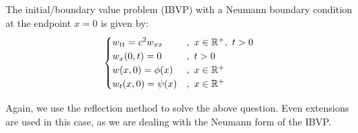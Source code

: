 \medskip 

\begin{defn} 
    The initial/boundary value problem (IBVP) with a Neumann boundary condition at the endpoint $x=0$ is given by:
    \[\begin{cases}
        w_{tt} = c^2 w_{xx} &,\ x\in{\mathbb R}^+,\ t > 0 \\
        w_x(0,t) = 0 &,\ t > 0 \\
        w(x,0) = \phi(x) &,\ x \in {\mathbb R}^+ \\
        w_t(x,0) = \psi(x) &,\ x \in {\mathbb R}^+
    \end{cases}\]
\end{defn}
Again, we use the reflection method to solve the above question. Even extensions are used in this case, as we are dealing with the Neumann form of the IBVP.

\medskip 

